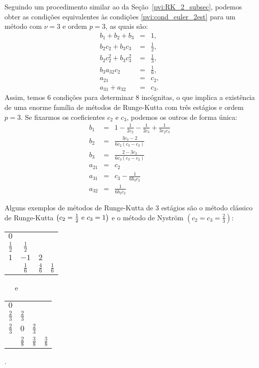 Seguindo um procedimento similar ao da Seção~\ref{pvi:RK_2_subsec}, podemos obter as condições equivalentes às condições \eqref{pvi:cond_euler_2est} para um método com $\nu =3$ e ordem $p=3$, as quais são:
\begin{eqnarray}\label{pvi:cond_euler_3est}
  b_1+b_2+b_3		&=& 1,            		\label{pvi:cond_euler_3est:1} \\
  b_2c_2+b_3c_3 	&=& \frac{1}{2},	 	\label{pvi:cond_euler_3est:2} \\
  b_2c_2^2+b_3c_3^2	&=& \frac{1}{3}, 		\label{pvi:cond_euler_3est:3} \\
  b_3a_{32}c_2		&=& \frac{1}{6},		\label{pvi:cond_euler_3est:4} \\
  a_{21}		&=& c_2,			\label{pvi:cond_euler_3est:5} \\
  a_{31}+a_{32}		&=& c_3.			\label{pvi:cond_euler_3est:6} 
\end{eqnarray}
Assim, temos 6 condições para determinar 8 incógnitas, o que implica a existência de uma enorme família de métodos de Runge-Kutta com três estágios e ordem $p=3$. Se fixarmos os coeficientes $c_2$ e $c_3$, podemos os outros de forma única:
\begin{eqnarray*}
 b_1&=&1-\frac{1}{2c_2}-\frac{1}{2c_3}+\frac{1}{3c_2c_3}\\
 b_2&=&\frac{3c_3-2}{6c_2(c_3-c_2)}\\
 b_3&=&\frac{2-3c_2}{6c_3(c_3-c_2)}\\
 a_{21}&=&c_2\\
 a_{31}&=&c_3-\frac{1}{6b_3c_2}\\
 a_{32}&=&\frac{1}{6b_3c_2}
\end{eqnarray*}


 Alguns exemplos de métodos de Runge-Kutta de 3 estágios são o método clássico de Runge-Kutta $\left(c_2=\frac{1}{2}\hbox{ e } c_3=1\right)$ e o método de Nyström $\left(c_2=c_3=\frac{2}{3}\right)$:
\begin{center}
\begin{tabular}{c|ccc}
  $0$           &               &               & \\
  $\frac{1}{2}$ & $\frac{1}{2}$ &               & \\
  $1$           & $-1$          & $2$           & \\  \hline
                & $\frac{1}{6}$ & $\frac{4}{6}$ & $\frac{1}{6}$
\end{tabular}
~~~e~~~~~~\begin{tabular}{c|ccc} 
  $0$ &     &   & \\
  $\frac{2}{3}$ & $\frac{2}{3}$ &   & \\
  $\frac{2}{3}$ & $0$ &$\frac{2}{3}$& \\  \hline
      & $\frac{2}{8}$ &$\frac{3}{8}$& $\frac{3}{8}$
\end{tabular}.
\end{center}

